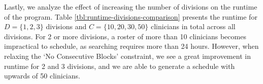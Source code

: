 Lastly, we analyze the effect of increasing the number of divisions on the runtime of the program. Table \ref{tbl:runtime-divisions-comparison} presents the runtime for $D = \{1, 2, 3\}$ divisions and $C = \{10, 20, 30, 50\}$ clinicians in total across all divisions. For 2 or more divisions, a roster of more than 10 clinicians becomes impractical to schedule, as searching requires more than 24 hours. However, when relaxing the `No Consecutive Blocks' constraint, we see a great improvement in runtime for 2 and 3 divisions, and we are able to generate a schedule with upwards of 50 clinicians.




